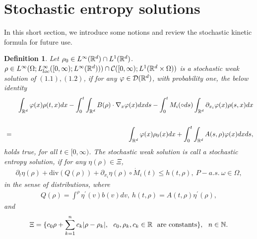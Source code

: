 \documentclass[11pt]{article}
\newtheorem{definition}{Definition}[section]
\begin{document}
\section{Stochastic entropy solutions}\label{sec2}
\setcounter{equation}{0} In this short section, we introduce some
notions and review the stochastic kinetic formula for future use.
\begin{definition} Let $\rho_0\in L^\infty({\mathbb R}^d)\cap L^1({\mathbb R}^d)$. $\rho\in L^\infty(\Omega;
L^\infty_{loc}([0,\infty);L^\infty({\mathbb R}^d)))\cap
{\mathcal C}([0,\infty);L^1({\mathbb R}^d\times \Omega))$ is a stochastic weak
solution of $(1.1), (1.2)$, if for any $\varphi\in {\mathcal
D}({\mathbb R}^d)$, with probability one, the below identity
\begin{eqnarray}\label{2.1}
&&\int_{{\mathbb R}^d}\varphi(x)\rho(t,x)dx -\int^t_0\int_{{\mathbb
R^d}}B(\rho)\cdot\nabla_x\varphi(x)dxds-\int^t_0M_i(\circ
ds)\int_{{{\mathbb R}^d}}\partial_{x_i}\varphi(x)\rho(s,x)dx \cr \cr &= &
\int_{{\mathbb R}^d}\varphi(x)\rho_0(x)dx
+\int^t_0\int_{{\mathbb R}^d}A(s,\rho)\varphi(x)dxds,
\end{eqnarray}
holds true, for all $t\in [0,\infty)$. The stochastic weak solution
is call a stochastic entropy solution, if for any  $\eta(\rho)\in
\Xi$,
\begin{eqnarray}\label{2.3}
\partial_t\eta(\rho)+\mbox{div}(Q(\rho))+
\partial_{x_i}\eta(\rho) \circ \dot{M}_i(t) \leq h(t,\rho), \
P-a.s. \ \omega\in\Omega,
\end{eqnarray}
in the sense of distributions, where
\begin{eqnarray}\label{2.4}
Q(\rho)=\int^\rho \eta^\prime(v)b(v)dv, \
h(t,\rho)=A(t,\rho)\eta^\prime(\rho),
\end{eqnarray}
and
$$
\Xi=\{c_0\rho+\sum_{k=1}^nc_k|\rho-\rho_k|, \ \ c_0, \rho_k, c_k\in
\mR \ \ \mbox{are constants}\}, \ \ n\in \mN.
$$
\end{definition}
\end{document}
